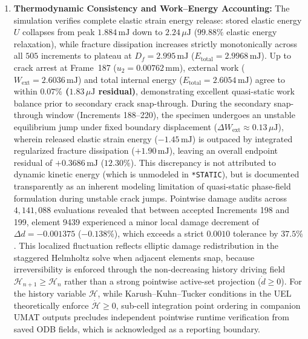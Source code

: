 \begin{enumerate}
  \item \textbf{Thermodynamic Consistency and Work--Energy Accounting:} The simulation verifies complete elastic strain energy release: stored elastic energy $U$ collapses from peak $1.884\,\mathrm{mJ}$ down to \textbf{$2.24\,\mu\mathrm{J}$} ($99.88\%$ elastic energy relaxation), while fracture dissipation increases strictly monotonically across all $505$ increments to plateau at $D_f = 2.995\,\mathrm{mJ}$ ($E_{\mathrm{total}} = 2.9968\,\mathrm{mJ}$). Up to crack arrest at Frame~187 ($u_2 = 0.00762\,\mathrm{mm}$), external work ($W_{\mathrm{ext}} = 2.6036\,\mathrm{mJ}$) and total internal energy ($E_{\mathrm{total}} = 2.6054\,\mathrm{mJ}$) agree to within \textbf{$0.07\%$ ($1.83\,\mu\mathrm{J}$ residual)}, demonstrating excellent quasi-static work balance prior to secondary crack snap-through. During the secondary snap-through window (Increments 188--220), the specimen undergoes an unstable equilibrium jump under fixed boundary displacement ($\Delta W_{\mathrm{ext}} \approx 0.13\,\mu\mathrm{J}$), wherein released elastic strain energy ($-1.45\,\mathrm{mJ}$) is outpaced by integrated regularized fracture dissipation ($+1.90\,\mathrm{mJ}$), leaving an overall endpoint residual of $+0.3686\,\mathrm{mJ}$ ($12.30\%$). This discrepancy is not attributed to dynamic kinetic energy (which is unmodeled in \texttt{*STATIC}), but is documented transparently as an inherent modeling limitation of quasi-static phase-field formulation during unstable crack jumps. Pointwise damage audits across $4{,}141{,}088$ evaluations revealed that between accepted Increments 198 and 199, element 9439 experienced a minor local damage decrement of $\Delta d = -0.001375$ ($-0.138\%$), which exceeds a strict $0.0010$ tolerance by $37.5\%$. This localized fluctuation reflects elliptic damage redistribution in the staggered Helmholtz solve when adjacent elements snap, because irreversibility is enforced through the non-decreasing history driving field $\mathcal{H}_{n+1} \ge \mathcal{H}_n$ rather than a strong pointwise active-set projection ($\dot{d} \ge 0$). For the history variable $\mathcal{H}$, while Karush--Kuhn--Tucker conditions in the UEL theoretically enforce $\dot{\mathcal{H}} \ge 0$, sub-cell integration point ordering in companion UMAT outputs precludes independent pointwise runtime verification from saved ODB fields, which is acknowledged as a reporting boundary.

\end{enumerate}
